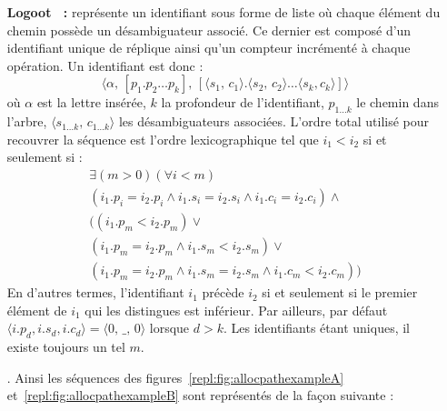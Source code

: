 \begin{itemize}
\item [\textbf{Logoot~\cite{weiss2009logoot, weiss2010logootundo} :}] représente
  un identifiant sous forme de liste où chaque élément du chemin possède un
  désambiguateur associé. Ce dernier est composé d'un identifiant unique de
  réplique ainsi qu'un compteur incrémenté à chaque opération. Un identifiant
  est donc :
  \begin{equation}
    \langle
    \alpha ,\,
    [p_1.p_2\ldots p_k],\,
    [\langle s_1,\,c_1 \rangle. \langle s_2,\,c_2\rangle \ldots \langle s_k, c_k\rangle ]
    \rangle
  \end{equation}
  où $\alpha$ est la lettre insérée, $k$ la profondeur de l'identifiant,
  $p_{1\ldots k}$ le chemin dans l'arbre,
  $\langle s_{1\ldots k},\, c_{1\ldots k}\rangle$ les désambiguateurs
  associées. L'ordre total utilisé pour recouvrer la séquence est l'ordre
  lexicographique tel que $i_1 < i_2$ si et seulement si :
  \begin{equation}
    \begin{multlined}
      \exists (m > 0)(\forall i < m)\\
      (i_1.p_i = i_2.p_i \wedge i_1.s_i = i_2.s_i \wedge i_1.c_i = i_2.c_i) \wedge\\
      ((i_1.p_m < i_2.p_m) \vee\\ (i_1.p_m = i_2.p_m \wedge i_1.s_m < i_2.s_m)
      \vee\\ (i_1.p_m = i_2.p_m \wedge i_1.s_m = i_2.s_m \wedge i_1.c_m <
      i_2.c_m))
    \end{multlined}
  \end{equation}
  En d'autres termes, l'identifiant $i_1$ précède $i_2$ si et seulement si le
  premier élément de $i_1$ qui les distingues est inférieur. Par ailleurs, par
  défaut $\langle i.p_d, i.s_d, i.c_d\rangle = \langle 0,\,\_,\,0 \rangle$
  lorsque $d > k$. Les identifiants étant uniques, il existe toujours un tel
  $m$.

  . Ainsi les séquences des figures~\ref{repl:fig:allocpathexampleA}
  et~\ref{repl:fig:allocpathexampleB} sont représentés de la façon suivante :


\end{itemize}
